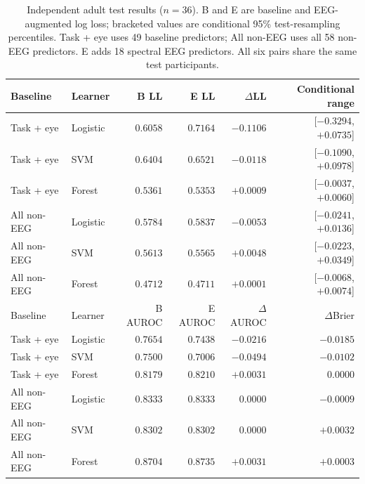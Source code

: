 \begin{table}[htbp]\centering
\caption{Independent adult test results ($n=36$). B and E are baseline and EEG-augmented log loss; bracketed values are conditional 95\% test-resampling percentiles. Task + eye uses 49 baseline predictors; All non-EEG uses all 58 non-EEG predictors. E adds 18 spectral EEG predictors. All six pairs share the same test participants.}\label{tab:adult-extension}
\begin{tabular}{llrrrr}\toprule
Baseline & Learner & B LL & E LL & $\Delta$LL & Conditional range\\\midrule
Task + eye & Logistic & $0.6058$ & $0.7164$ & $-0.1106$ & [$-0.3294$, $+0.0735$]\\
Task + eye & SVM & $0.6404$ & $0.6521$ & $-0.0118$ & [$-0.1090$, $+0.0978$]\\
Task + eye & Forest & $0.5361$ & $0.5353$ & $+0.0009$ & [$-0.0037$, $+0.0060$]\\
All non-EEG & Logistic & $0.5784$ & $0.5837$ & $-0.0053$ & [$-0.0241$, $+0.0136$]\\
All non-EEG & SVM & $0.5613$ & $0.5565$ & $+0.0048$ & [$-0.0223$, $+0.0349$]\\
All non-EEG & Forest & $0.4712$ & $0.4711$ & $+0.0001$ & [$-0.0068$, $+0.0074$]\\
\midrule Baseline & Learner & B AUROC & E AUROC & $\Delta$AUROC & $\Delta$Brier\\\midrule
Task + eye & Logistic & $0.7654$ & $0.7438$ & $-0.0216$ & $-0.0185$\\
Task + eye & SVM & $0.7500$ & $0.7006$ & $-0.0494$ & $-0.0102$\\
Task + eye & Forest & $0.8179$ & $0.8210$ & $+0.0031$ & $0.0000$\\
All non-EEG & Logistic & $0.8333$ & $0.8333$ & $0.0000$ & $-0.0009$\\
All non-EEG & SVM & $0.8302$ & $0.8302$ & $0.0000$ & $+0.0032$\\
All non-EEG & Forest & $0.8704$ & $0.8735$ & $+0.0031$ & $+0.0003$\\
\bottomrule\end{tabular}\end{table}
